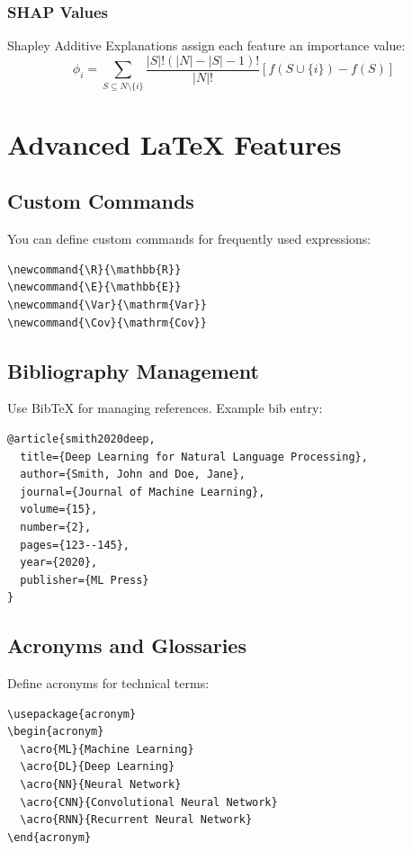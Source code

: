 \documentclass{article}
\begin{document}
\subsubsection{SHAP Values}

Shapley Additive Explanations assign each feature an importance value:
\[
\phi_i = \sum_{S \subseteq N \setminus \{i\}} \frac{|S|! (|N| - |S| - 1)!}{|N|!}
\left[ f(S \cup \{i\}) - f(S) \right]
\]

\section{Advanced LaTeX Features}

\subsection{Custom Commands}

You can define custom commands for frequently used expressions:

\begin{verbatim}
\newcommand{\R}{\mathbb{R}}
\newcommand{\E}{\mathbb{E}}
\newcommand{\Var}{\mathrm{Var}}
\newcommand{\Cov}{\mathrm{Cov}}
\end{verbatim}

\subsection{Bibliography Management}

Use BibTeX for managing references. Example bib entry:

\begin{verbatim}
@article{smith2020deep,
  title={Deep Learning for Natural Language Processing},
  author={Smith, John and Doe, Jane},
  journal={Journal of Machine Learning},
  volume={15},
  number={2},
  pages={123--145},
  year={2020},
  publisher={ML Press}
}
\end{verbatim}

\subsection{Acronyms and Glossaries}

Define acronyms for technical terms:

\begin{verbatim}
\usepackage{acronym}
\begin{acronym}
  \acro{ML}{Machine Learning}
  \acro{DL}{Deep Learning}
  \acro{NN}{Neural Network}
  \acro{CNN}{Convolutional Neural Network}
  \acro{RNN}{Recurrent Neural Network}
\end{acronym}
\end{verbatim}
\end{document}
